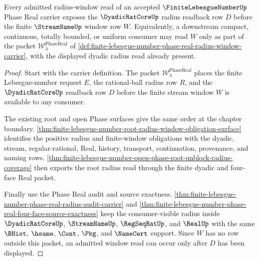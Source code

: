 \begin{theorem}
\label{thm:finite-lebesgue-number-dyadic-radius-window-admission}
Every admitted radius-window read of an accepted $\FiniteLebesgueNumberUp$ Phase Real carrier exposes the $\DyadicRatCoreUp$ radius readback row $D$ before the finite $\StreamNameUp$ window row $W$. Equivalently, a downstream compact, continuous, totally bounded, or uniform consumer may read $W$ only as part of the packet $\mathcal{W}_{\lambda}^{\mathrm{PhaseReal}}$ of \autoref{def:finite-lebesgue-number-phase-real-radius-window-carrier}, with the displayed dyadic radius read already present.
\end{theorem}
\begin{proof}
Start with the carrier definition. The packet $\mathcal{W}_{\lambda}^{\mathrm{PhaseReal}}$ places the finite Lebesgue-number request $E$, the rational-ball radius row $R$, and the $\DyadicRatCoreUp$ readback row $D$ before the finite stream window $W$ is available to any consumer.

The existing root and open Phase surfaces give the same order at the chapter boundary. \autoref{thm:finite-lebesgue-number-root-radius-window-obligation-surface} identifies the positive radius and finite-window obligations with the dyadic, stream, regular-rational, Real, history, transport, continuation, provenance, and naming rows. \autoref{thm:finite-lebesgue-number-open-phase-root-unblock-radius-coverage} then exports the root radius read through the finite dyadic and four-face Real packet.

Finally use the Phase Real audit and source exactness. \autoref{thm:finite-lebesgue-number-phase-real-radius-audit-carrier} and \autoref{thm:finite-lebesgue-number-phase-real-four-face-source-exactness} keep the consumer-visible radius inside $\DyadicRatCoreUp$, $\StreamNameUp$, $\RegSeqRatUp$, and $\RealUp$ with the same $\BHist$, $\hsame$, $\Cont$, $\Pkg$, and $\NameCert$ support. Since $W$ has no row outside this packet, an admitted window read can occur only after $D$ has been displayed.
\end{proof}

